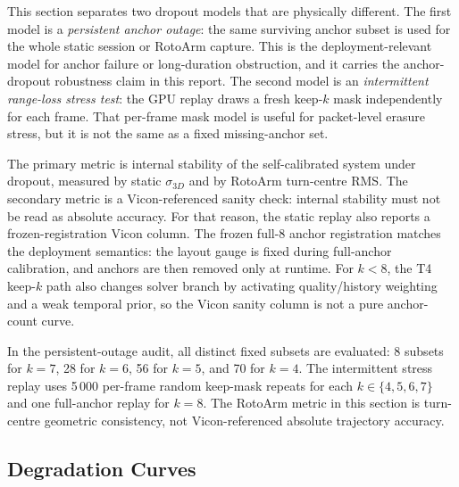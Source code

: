 \documentclass[11pt,a4paper]{article}
\begin{document}
This section separates two dropout models that are physically different.
The first model is a \emph{persistent anchor outage}: the same surviving anchor subset is used for the whole static session or RotoArm capture.
This is the deployment-relevant model for anchor failure or long-duration obstruction, and it carries the anchor-dropout robustness claim in this report.
The second model is an \emph{intermittent range-loss stress test}: the GPU replay draws a fresh keep-$k$ mask independently for each frame.
That per-frame mask model is useful for packet-level erasure stress, but it is not the same as a fixed missing-anchor set.

The primary metric is internal stability of the self-calibrated system under dropout, measured by static $\sigma_{3D}$ and by RotoArm turn-centre RMS.
The secondary metric is a Vicon-referenced sanity check: internal stability must not be read as absolute accuracy.
For that reason, the static replay also reports a frozen-registration Vicon column.
The frozen full-8 anchor registration matches the deployment semantics: the layout gauge is fixed during full-anchor calibration, and anchors are then removed only at runtime.
For $k<8$, the T4 keep-$k$ path also changes solver branch by activating quality/history weighting and a weak temporal prior, so the Vicon sanity column is not a pure anchor-count curve.

In the persistent-outage audit, all distinct fixed subsets are evaluated: 8 subsets for $k=7$, 28 for $k=6$, 56 for $k=5$, and 70 for $k=4$.
The intermittent stress replay uses 5\,000 per-frame random keep-mask repeats for each $k \in \{4,5,6,7\}$ and one full-anchor replay for $k=8$.
The RotoArm metric in this section is turn-centre geometric consistency, not Vicon-referenced absolute trajectory accuracy.

\subsection{Degradation Curves}
\end{document}

